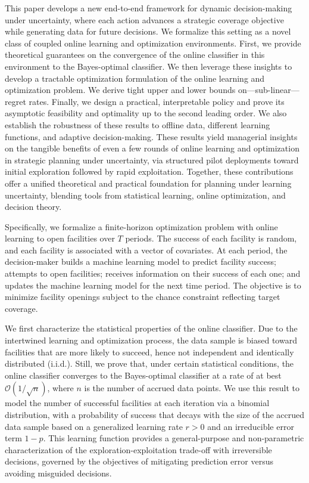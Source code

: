 \documentclass[nonblindrev]{informs3noheader}
\def\calO{\mathcal{O}}
\begin{document}
This paper develops a new end-to-end framework for dynamic decision-making under uncertainty, where each action advances a strategic coverage objective while generating data for future decisions. We formalize this setting as a novel class of coupled online learning and optimization environments. First, we provide theoretical guarantees on the convergence of the online classifier in this environment to the Bayes-optimal classifier. We then leverage these insights to develop a tractable optimization formulation of the online learning and optimization problem. We derive tight upper and lower bounds on---sub-linear---regret rates. Finally, we design a practical, interpretable policy and prove its asymptotic feasibility and optimality up to the second leading order. We also establish the robustness of these results to offline data, different learning functions, and adaptive decision-making. These results yield managerial insights on the tangible benefits of even a few rounds of online learning and optimization in strategic planning under uncertainty, via structured pilot deployments toward initial exploration followed by rapid exploitation. Together, these contributions offer a unified theoretical and practical foundation for planning under learning uncertainty, blending tools from statistical learning, online optimization, and decision theory.

Specifically, we formalize a finite-horizon optimization problem with online learning to open facilities over $T$ periods. The success of each facility is random, and each facility is associated with a vector of covariates. At each period, the decision-maker builds a machine learning model to predict facility success; attempts to open facilities; receives information on their success of each one; and updates the machine learning model for the next time period. The objective is to minimize facility openings subject to the chance constraint reflecting target coverage.

We first characterize the statistical properties of the online classifier. Due to the intertwined learning and optimization process, the data sample is biased toward facilities that are more likely to succeed, hence not independent and identically distributed (i.i.d.). Still, we prove that, under certain statistical conditions, the online classifier converges to the Bayes-optimal classifier at a rate of at best $\calO(1/\sqrt n)$, where $n$ is the number of accrued data points. We use this result to model the number of successful facilities at each iteration via a binomial distribution, with a probability of success that decays with the size of the accrued data sample based on a generalized learning rate $r>0$ and an irreducible error term $1-p$. This learning function provides a general-purpose and non-parametric characterization of the exploration-exploitation trade-off with irreversible decisions, governed by the objectives of mitigating prediction error versus avoiding misguided decisions.
\end{document}
